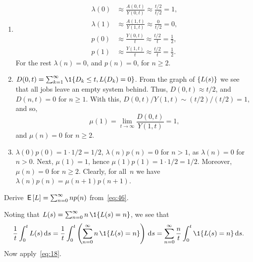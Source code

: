 \documentclass[queueing-book.tex]{subfiles}
\begin{document}
\begin{exercise}
\begin{solution}
\begin{enumerate}
Since $Y(n,t)=0$ for all $n\geq 2$, $L(s) = 1$ or
 $L(s)=0$ for all~$s$, therefore,
 \begin{equation*}
 Y(0,t) = t-Y(1,t).
 \end{equation*}
 \item
 \begin{align*}
 \lambda(0) &\approx \frac{A(0,t)}{Y(0,t)} \approx \frac{t/2}{t/2} = 1, \\
 \lambda(1) &\approx \frac{A(1,t)}{Y(1,t)} \approx \frac{0}{t/2} = 0, \\
 p(0) &\approx \frac{Y(0,t)}{t} \approx \frac{t/2}{t} = \frac 1 2, \\
 p(1) &\approx \frac{Y(1,t)}{t} \approx \frac{t/2}{t} = \frac 1 2.
 \end{align*}
For the rest $\lambda(n) = 0$, and $p(n)=0$, for $n\geq 2$.
\item
 $D(0,t) = \sum_{k=1}^\infty\1{D_k\leq t, L(D_k)=0}$. From the graph of $\{L(s)\}$ we see that all jobs leave an empty system behind. Thus, $D(0,t) \approx t/2$, and $D(n,t)=0$ for $n\geq 1$. With this, $D(0,t)/Y(1,t) \sim (t/2)/(t/2) = 1$, and so,
 \begin{equation*}
 \mu(1) = \lim_{t\to\infty} \frac{D(0,t)}{Y(1, t)} = 1,
 \end{equation*}
and $\mu(n) = 0$ for $n\geq2$.
\item
 $\lambda(0)p(0)=1\cdot 1/2 = 1/2$, $\lambda(n)p(n)= 0$ for $n>1$, as $\lambda(n)=0$ for $n>0$.
Next, $\mu(1)=1$, hence $\mu(1) p(1) = 1\cdot 1/2 = 1/2$. Moreover, $\mu(n)=0$ for $n\geq 2$.
Clearly, for all~$n$ we have $\lambda(n)p(n)= \mu(n+1)p(n+1)$.
\end{enumerate}
\end{solution}
\end{exercise}

\begin{exercise}\label{ex:l-111}
 Derive $\,\mathsf{E}\left[L\right] = \sum_{n=0}^\infty n p(n)$ from~\cref{eq:46}.
\begin{solution}
Noting that %
$L(s) = \sum_{n=0}^\infty n\, \1{\L(s) = n}$, we see that
\begin{equation*}
\frac 1 t \int_0^t L(s) \d s = \frac 1 t \int_0^t \left(\sum_{n=0}^{\infty} n\, \1{\L(s) = n}\right) \d s
= \sum_{n=0}^{\infty} \frac n t \int_0^t \1{\L(s) = n} \d s.
\end{equation*}
Now apply~\cref{eq:18}.
\end{solution}
\end{exercise}
\end{document}
